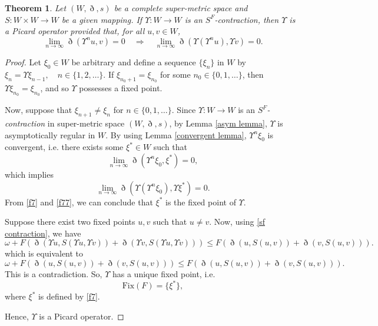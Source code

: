 \documentclass[pdflatex,sn-mathphys-num]{sn-jnl}%
\theoremstyle{thmstyleone}%
\newtheorem{theorem}{Theorem}%
\theoremstyle{thmstyletwo}%
\theoremstyle{thmstylethree}%
\begin{document}
\begin{theorem}\label{sf theorem}
  Let $(W,\eth,s)$ be a complete super-metric space and $S:W\times W \to W$ be a given mapping. 
If $\Upsilon  : W \to W$ is an \textit{$S^F$-contraction}, then $\Upsilon $ is a \textit{Picard operator} provided that, for all $u,v \in W$,
\[
\lim_{n \to \infty} \eth(\Upsilon^n u, v) = 0 
\quad \Longrightarrow \quad 
\lim_{n \to \infty} \eth(\Upsilon(\Upsilon^n u), \Upsilon  v) = 0.
\]
\end{theorem}
\begin{proof}
 Let $\xi_0 \in W$ be arbitrary and define a sequence $\{\xi_n\}$ in $W$ by $\xi_n = \Upsilon \xi _{n-1}, \quad n \in \{1,2,\ldots\}$. If $\xi_{n_0+1} = \xi_{n_0}$ for some $n_0 \in \{0,1,\ldots\}$, then $\Upsilon \xi_{n_0} = \xi_{n_0}$, and so $\Upsilon $ possesses a fixed point.

Now, suppose that $\xi_{n+1} \neq \xi_n$ for $n \in \{0,1,\ldots\}$.
    Since $\Upsilon : W \to W$ is an \textit{$S^F$-contraction} in super-metric space $(W,\eth,s)$, by Lemma \ref{asym lemma}, $\Upsilon $ is asymptotically regular in $W$. By using Lemma \ref{convergent lemma}, $\Upsilon^n \xi_0$ is convergent, i.e. 
  there exists some $\xi^* \in W$ such that \begin{equation}\label{f7}
    \lim_{n \to \infty} \eth(\Upsilon^n\xi_0,\xi^*)=0,
\end{equation} 
which implies  \begin{equation}\label{f77}
    \lim_{n \to \infty} \eth(\Upsilon(\Upsilon^n\xi_0),\Upsilon \xi ^*)=0.
\end{equation} 
From \eqref{f7} and \eqref{f77}, we can conclude that  $\xi^*$ is the fixed point of $\Upsilon $.

Suppose there exist two fixed points $u,v$ such that $u\ne v$. Now, using \eqref{sf contraction}, we have
\begin{equation*}
    \omega  + F\left(\eth(\Upsilon u,S(\Upsilon u,\Upsilon  v))+\eth(\Upsilon v,S(\Upsilon u,\Upsilon  v))\right) \le F\left(\eth(u,S(u,v))+\eth(v,S(u,v))\right).
\end{equation*}
which is equivalent to
\begin{equation*}
    \omega  + F\left(\eth(u,S(u,v))+\eth(v,S(u,v))\right) \le F\left(\eth(u,S(u,v))+\eth(v,S(u,v))\right).
\end{equation*}
This is a contradiction. 
So, $\Upsilon $ has a unique fixed point, i.e. 
\[
\mathrm{Fix}(F)=\{\xi ^{*}\},
\]
where $\xi^{*}$ is defined by \eqref{f7}. 

Hence, $\Upsilon$ is a Picard operator.
\end{proof}
\end{document}
